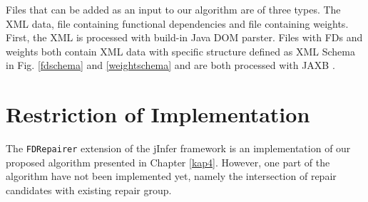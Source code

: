 Files that can be added as an input to our algorithm are of three types. The XML data, file containing functional dependencies and file containing weights. First, the XML is processed with build-in Java DOM parster. Files with FDs and weights both contain XML data with specific structure defined as XML Schema in Fig. \ref{fdschema} and \ref{weightschema} and are both processed with JAXB \cite{JAXB}.


\section{Restriction of Implementation}

The \texttt{FDRepairer} extension of the jInfer framework is an implementation of our proposed algorithm presented in Chapter \ref{kap4}. However, one part of the algorithm have not been implemented yet, namely the intersection of repair candidates with existing repair group.
